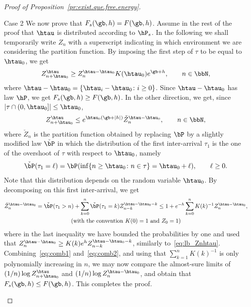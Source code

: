 \begin{proof}[Proof of Proposition~\ref{pr:exist.que.free.energy}]
\begin{laststep}{Case 2}
We now prove that $F_s(\gb,h) = F(\gb,h)$. Assume in the rest of the proof that $\htau$ is distributed according to $\hP_s$. In the following we shall temporarily write $Z_n$ with a superscript indicating in which environment we are considering the partition function. By imposing the first step of $\tau$ to be equal to $\htau_0$, we get
\begin{equation}\label{eq:lb_Znhtau}
Z_{n + \htau_0}^{\htau} \geq Z_{n}^{\htau - \htau_0} K(\htau_0) e^{\gb + h}, \qquad n \in \bbN,
\end{equation}
where $\htau - \htau_0 = \{\htau_i - \htau_0 \colon i \geq 0\}$. Since $\htau - \htau_0$ has law $\hP$, we get $F_s(\gb,h) \geq F(\gb,h)$. In the other direction, we get, since $|\tau \cap (0,\htau_0]| \leq \htau_0$,
\begin{equation}\label{eq:comb1}
Z_{n + \htau_0}^{\htau} \leq e^{\htau_0 (\gb + |h|)} \check Z_n^{\htau - \htau_0}, \qquad n \in \bbN,
\end{equation}
where $\check Z_n$ is the partition function obtained by replacing $\bP$ by a slightly modified law $\check \bP$ in which the distribution of the first inter-arrival $\tau_1$ is the one of the overshoot of $\tau$ with respect to $\htau_0$, namely
\begin{equation}
\check \bP(\tau_1 = \ell) = \bP(\inf \{n \geq \htau_0 \colon n \in \tau \} = \htau_0 + \ell), \qquad \ell \geq 0.
\end{equation}
Note that this distribution depends on the random variable $\htau_0$. By decomposing on this first inter-arrival, we get
\begin{multline}\label{eq:comb2}
\check Z_n^{\htau - \htau_0} = \check \bP(\tau_1 > n) + \sum_{k=0}^n \check \bP(\tau_1 = k) Z_{n - k}^{\htau - \htau_0 -k}\leq 1 + e^{-h}\sum_{k=0}^n K(k)^{-1} Z_n^{\htau - \htau_0}, \\
\text{(with the convention $K(0)=1$ and $Z_0 = 1$)}
\end{multline}
where in the last inequality we have bounded the probabilities by one and used that $Z_n^{\htau - \htau_0} \ge K(k) e^{h} Z_{n - k}^{\htau - \htau_0 - k}$, similarly to~\eqref{eq:lb_Znhtau}. Combining~\eqref{eq:comb1} and~\eqref{eq:comb2}, and using that $\sum_{k=1}^n K(k)^{-1}$ is only polynomially increasing in $n$, we may now compare the almost-sure limits of $(1/n) \log Z_{n + \htau_0}^{\htau}$ and $(1/n) \log Z_n^{\htau - \htau_0}$, and obtain that $F_s(\gb,h) \leq F(\gb,h)$. This completes the proof.
\end{laststep}
\let\qed\relax
\end{proof}


